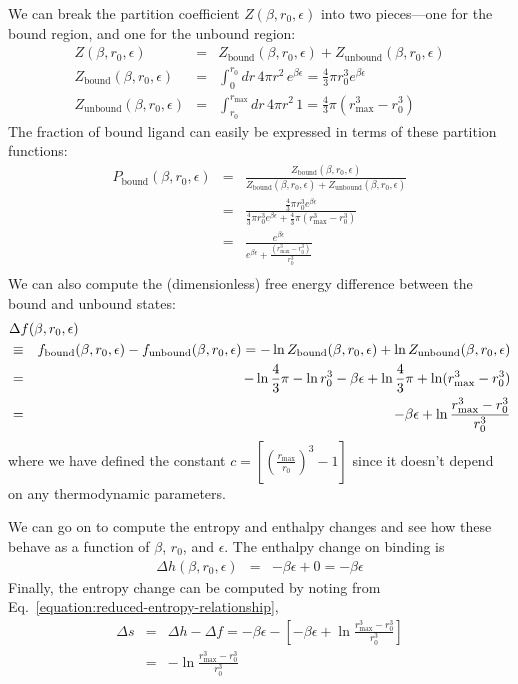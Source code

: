 \documentclass[english,course]{lecture}
\begin{document}
We can break the partition coefficient $Z(\beta, r_0, \epsilon)$ into two pieces---one for the bound region, and one for the unbound region:
\begin{eqnarray}
Z(\beta, r_0, \epsilon) &=& Z_\mathrm{bound}(\beta, r_0, \epsilon) + Z_\mathrm{unbound}(\beta, r_0, \epsilon) \\
Z_\mathrm{bound}(\beta, r_0, \epsilon) &=& \int_0^{r_0} dr \, 4 \pi r^2 \, e^{\beta \epsilon} = \frac{4}{3} \pi r_0^3 e^{\beta \epsilon} \\
Z_\mathrm{unbound}(\beta, r_0, \epsilon) &=& \int_{r_0}^{r_\mathrm{max}} dr \, 4 \pi r^2 \, 1 = \frac{4}{3} \pi (r_\mathrm{max}^3 - r_0^3)
\end{eqnarray}
The fraction of bound ligand can easily be expressed in terms of these partition functions:
\begin{eqnarray}
P_\mathrm{bound}(\beta, r_0, \epsilon) &=& \frac{Z_\mathrm{bound}(\beta, r_0, \epsilon)}{Z_\mathrm{bound}(\beta, r_0, \epsilon) + Z_\mathrm{unbound}(\beta, r_0, \epsilon)} \\
&=& \frac{\frac{4}{3} \pi r_0^3 e^{\beta \epsilon}}{\frac{4}{3} \pi r_0^3 e^{\beta \epsilon} + \frac{4}{3} \pi (r_\mathrm{max}^3 - r_0^3)} \\
&=& \frac{e^{\beta \epsilon}}{e^{\beta \epsilon} + \frac{(r_\mathrm{max}^3 - r_0^3)}{r_0^3}} \\
\end{eqnarray}
We can also compute the (dimensionless) free energy difference between the bound and unbound states:
\begin{eqnarray}
\lefteqn{\Delta f(\beta, r_0, \epsilon)} \\
&\equiv& f_\mathrm{bound}(\beta, r_0, \epsilon) - f_\mathrm{unbound}(\beta, r_0, \epsilon) = - \ln Z_\mathrm{bound}(\beta, r_0, \epsilon) + \ln Z_\mathrm{unbound}(\beta, r_0, \epsilon) \\
&=& - \ln \frac{4}{3}\pi - \ln r_0^3 - \beta \epsilon + \ln \frac{4}{3}\pi + \ln (r_\mathrm{max}^3 - r_0^3) \\
&=& - \beta \epsilon + \ln \frac{r_\mathrm{max}^3 - r_0^3}{r_0^3}
\end{eqnarray}
where we have defined the constant $c = \left[ \left(\frac{r_\mathrm{max}}{r_0}\right)^3 - 1 \right]$ since it doesn't depend on any thermodynamic parameters.

We can go on to compute the entropy and enthalpy changes and see how these behave as a function of $\beta$, $r_0$, and $\epsilon$.
The enthalpy change on binding is
\begin{eqnarray}
\Delta h(\beta, r_0, \epsilon) &=& - \beta \epsilon +  0 = - \beta \epsilon
\end{eqnarray}
Finally, the entropy change can be computed by noting from Eq.~\ref{equation:reduced-entropy-relationship},
\begin{eqnarray}
\Delta s &=& \Delta h - \Delta f = - \beta \epsilon - \left[ - \beta \epsilon + \ln \frac{r_\mathrm{max}^3 - r_0^3}{r_0^3} \right ] \\
&=& - \ln \frac{r_\mathrm{max}^3 - r_0^3}{r_0^3}
\end{eqnarray}
\end{document}
